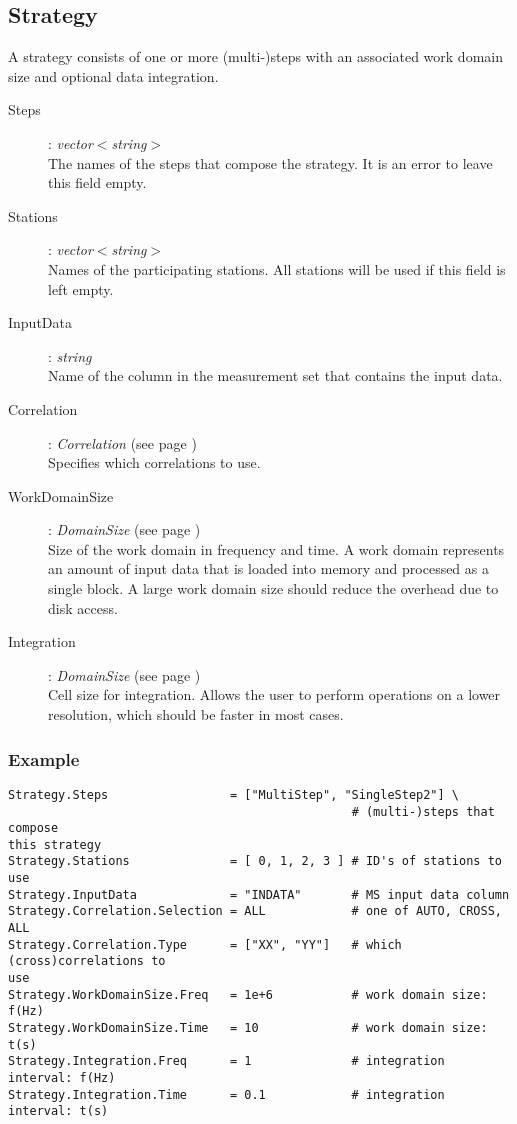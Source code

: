 \documentclass[10pt]{lofar}
\begin{document}
\subsection*{Strategy}
A strategy consists of one or more (multi-)steps with an associated work domain
size and optional data integration.
\begin{description}
\item [Steps] : \emph{vector$<$string$>$} \\
    The names of the steps that compose the strategy. It is an error to leave
this field empty. 
\item [Stations] : \emph{vector$<$string$>$} \\
    Names of the participating stations. All stations will be used if this field
is left empty. 
\item [InputData] : \emph{string} \\
    Name of the column in the measurement set that contains the input data. 
\item [Correlation] : \emph{Correlation} (see page \pageref{app-correlation}) \\
    Specifies which correlations to use. 
\item [WorkDomainSize] : \emph{DomainSize} (see page \pageref{app-domainsize})
\\
    Size of the work domain in frequency and time. A work domain represents an
amount of input data that is loaded into memory and processed as a single block.
A large work domain size should reduce the overhead due to disk access. 
\item [Integration] : \emph{DomainSize} (see page \pageref{app-domainsize}) \\
    Cell size for integration. Allows the user to perform operations on a lower
resolution, which should be faster in most cases. 
\end{description}

\subsubsection*{Example}
{\footnotesize
\begin{verbatim}
Strategy.Steps                 = ["MultiStep", "SingleStep2"] \
                                                # (multi-)steps that compose
this strategy
Strategy.Stations              = [ 0, 1, 2, 3 ] # ID's of stations to use
Strategy.InputData             = "INDATA"       # MS input data column
Strategy.Correlation.Selection = ALL            # one of AUTO, CROSS, ALL
Strategy.Correlation.Type      = ["XX", "YY"]   # which (cross)correlations to
use
Strategy.WorkDomainSize.Freq   = 1e+6           # work domain size: f(Hz)
Strategy.WorkDomainSize.Time   = 10             # work domain size: t(s)
Strategy.Integration.Freq      = 1              # integration interval: f(Hz)
Strategy.Integration.Time      = 0.1            # integration interval: t(s)
\end{verbatim}
}
\end{document}
